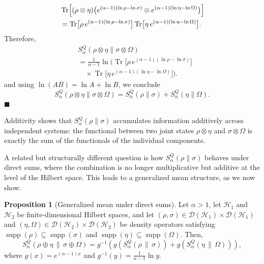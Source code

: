 \documentclass[a4paper, amsfonts, amssymb, amsmath, reprint, showkeys, nofootinbib, twoside, aps, pra]{revtex4-2}
\theoremstyle{definition}
\newtheorem{proposition}[theorem]{Proposition}
\renewenvironment{proof}{\noindent{\bfseries Proof.}}{\hfill$\blacksquare$}
\begin{document}
\begin{proof}
\begin{equation}
\begin{aligned}
&\operatorname{Tr}\Bigl[ (\rho \otimes \eta) \bigl( e^{(\alpha-1)(\ln\rho-\ln\sigma)} \otimes e^{(\alpha-1)(\ln\eta-\ln\Omega)} \bigr) \Bigr] \\
&= \operatorname{Tr}\bigl[ \rho\,e^{(\alpha-1)(\ln\rho-\ln\sigma)} \bigr] \operatorname{Tr}\bigl[ \eta\,e^{(\alpha-1)(\ln\eta-\ln\Omega)} \bigr].
\end{aligned}
\end{equation}
Therefore,
\begin{equation}
\begin{aligned}
&S^Q_{\alpha}(\rho \otimes \eta \| \sigma \otimes \Omega) \\
&= \frac{1}{\alpha-1} \ln \Biggl( \operatorname{Tr}\bigl[ \rho\,e^{(\alpha-1)(\ln\rho-\ln\sigma)} \bigr] \\
&\quad \times \operatorname{Tr}\bigl[ \eta\,e^{(\alpha-1)(\ln\eta-\ln\Omega)} \bigr] \Biggr).
\end{aligned}
\end{equation}
and using $\ln(AB)=\ln A+\ln B$, we conclude
\begin{equation}
S^Q_{\alpha}(\rho \otimes \eta \| \sigma \otimes \Omega)
=
S^Q_{\alpha}(\rho \| \sigma)
+
S^Q_{\alpha}(\eta \| \Omega).
\end{equation}
\end{proof}

Additivity shows that $S^Q_\alpha(\rho \| \sigma)$ accumulates information additively across 
independent systems: the functional between two joint states $\rho \otimes \eta$ and $\sigma \otimes \Omega$ is exactly the sum of the functionals of the individual components. 

A related but structurally different question is how $S^Q_\alpha(\rho \| \sigma)$  behaves under direct sums, where the combination is no longer multiplicative but additive at the level of the Hilbert space. This leads to a generalized mean structure, as we now show.



\begin{proposition}[Generalized mean under direct sums]
Let $\alpha >1$, let $\mathcal{H}_1$ and $\mathcal{H}_2$ 
be finite-dimensional Hilbert spaces, and let
$(\rho,\sigma) \in \mathcal{D}(\mathcal{H}_1) \times \mathcal{D}(\mathcal{H}_1)$ 
and $(\eta,\Omega) \in \mathcal{D}(\mathcal{H}_2) \times \mathcal{D}(\mathcal{H}_2)$
be density operators satisfying
$\operatorname{supp}(\rho)\subseteq\operatorname{supp}(\sigma)$ and
$\operatorname{supp}(\eta)\subseteq\operatorname{supp}(\Omega)$.
Then,
\begin{equation}
S^Q_\alpha(\rho\oplus\eta \,\|\, \sigma\oplus\Omega)
=
g^{-1}\!\left(
g\!\left(S^Q_\alpha(\rho \,\|\, \sigma)\right)
+
g\!\left(S^Q_\alpha(\eta \,\|\, \Omega)\right)
\right),
\label{eq:direct-sum-mean}
\end{equation}
where $g(x)=e^{(\alpha-1)x}$ and $g^{-1}(y)=\frac{1}{\alpha-1}\ln y$.
\end{proposition}
\end{document}
